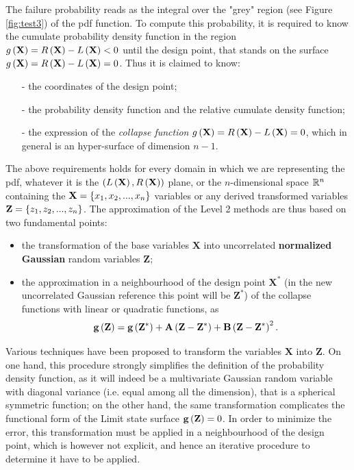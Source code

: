 The failure probability reads as the integral over the "grey" region (see Figure \ref{fig:test3}) of the pdf function. To compute this probability, it is required to know the cumulate probability density function in the region $g\left( \mathbf{X} \right)=R\left( \mathbf{X} \right)-L\left( \mathbf{X} \right)< 0 $ until the design point, that stands on the surface $g\left( \mathbf{X} \right)=R\left( \mathbf{X} \right)-L\left( \mathbf{X} \right)= 0$. Thus it is claimed to know:
\begin{itemize}
\item[-]the coordinates of the design point;
\item[-] the probability density function and the relative cumulate density function;
\item[-] the expression of the \textit{collapse function} $g\left( \mathbf{X} \right)= R\left( \mathbf{X} \right)-L\left( \mathbf{X} \right)= 0 $, which in general is an hyper-surface of dimension $n-1$.
\end{itemize}
The above requirements holds for every domain in which we are representing the pdf, whatever it is the $\left( L\left( \mathbf{X} \right),R\left( \mathbf{X} \right) \right)$ plane, or the $n$-dimensional space $\mathbb{ R}^n$ containing the $\textbf{X} = \left\lbrace x_{1}, x_{2},..., x_{n} \right\rbrace$ variables or any derived transformed variables $\textbf{Z} = \left\lbrace z_{1}, z_{2},..., z_{n} \right\rbrace$. The approximation of the Level 2 methods are thus based on two fundamental points:
\begin{itemize}
\item the transformation of the base variables $\mathbf{X}$ into uncorrelated \textbf{normalized Gaussian} random variables $\mathbf{Z}$;
\item the approximation in a neighbourhood of the design point $\mathbf{X}^{*}$ (in the new uncorrelated Gaussian reference this point will be $\mathbf{Z}^{*}$) of the collapse functions with linear or quadratic functions, as
\begin{equation}\label{level2complete}
\mathbf{g}\left( \mathbf{Z} \right)=\mathbf{g}\left( \mathbf{Z}^{*} \right)+\mathbf{A}\left( \mathbf{Z}-\mathbf{Z}^{*} \right)+\mathbf{B}\left( \mathbf{Z}-\mathbf{Z}^{*} \right)^{2}.
\end{equation}
\end{itemize}
Various techniques have been proposed to transform the variables $\mathbf{X}$ into $\mathbf{Z}$. On one hand, this procedure strongly simplifies the definition of the probability density function, as it will indeed be a multivariate Gaussian random variable with diagonal variance (i.e. equal among all the dimension), that is a spherical symmetric function; on the other hand, the same transformation complicates the functional form of the Limit state surface $\mathbf{g}\left( \mathbf{Z} \right)=0$. In order to minimize the error, this transformation must be applied in a neighbourhood of the design point, which is however not explicit, and hence an iterative procedure to determine it have to be applied. 
